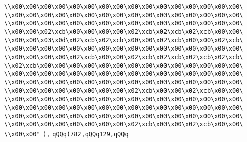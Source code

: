 \verb|\\x00\x00\x00\x00\x00\x00\x00\x00\x00\x00\x00\x00\x00\x00\x00\x00\|\newline
\verb|\\x00\x00\x00\x00\x00\x00\x00\x00\x00\x00\x00\x00\x00\x00\x00\x00\|\newline
\verb|\\x00\x00\x00\x00\x00\x00\x00\x00\x00\x00\x00\x00\x00\x00\x00\x00\|\newline
\verb|\\x00\x00\x02\xcb\x00\x00\x00\x00\x02\xcb\x02\xcb\x02\xcb\x00\x00\|\newline
\verb|\\x00\x00\x03\x0d\x02\xcb\x02\xcb\x00\x00\x02\xcb\x00\x00\x02\xcb\|\newline
\verb|\\x00\x00\x00\x00\x00\x00\x00\x00\x00\x00\x00\x00\x00\x00\x00\x00\|\newline
\verb|\\x00\x00\x00\x00\x02\xcb\x00\x00\x02\xcb\x02\xcb\x02\xcb\x02\xcb\|\newline
\verb|\\x02\xcb\x00\x00\x00\x00\x00\x00\x00\x00\x00\x00\x00\x00\x00\x00\|\newline
\verb|\\x00\x00\x00\x00\x00\x00\x00\x00\x00\x00\x00\x00\x00\x00\x00\x00\|\newline
\verb|\\x00\x00\x00\x00\x00\x00\x00\x00\x00\x00\x00\x00\x00\x00\x00\x00\|\newline
\verb|\\x00\x00\x00\x00\x00\x00\x00\x00\x02\xcb\x00\x00\x02\xcb\x00\x00\|\newline
\verb|\\x00\x00\x00\x00\x00\x00\x00\x00\x00\x00\x00\x00\x00\x00\x00\x00\|\newline
\verb|\\x00\x00\x00\x00\x00\x00\x00\x00\x00\x00\x00\x00\x00\x00\x00\x00\|\newline
\verb|\\x00\x00\x00\x00\x00\x00\x00\x00\x00\x00\x00\x00\x00\x00\x00\x00\|\newline
\verb|\\x00\x00\x00\x00\x00\x00\x00\x00\x02\xcb\x00\x00\x02\xcb\x00\x00\|\newline
\verb|\\x00\x00"|\newline
\verb|),|\newline
\verb|qQQq(782,qQQq129,qQQq|\newline
